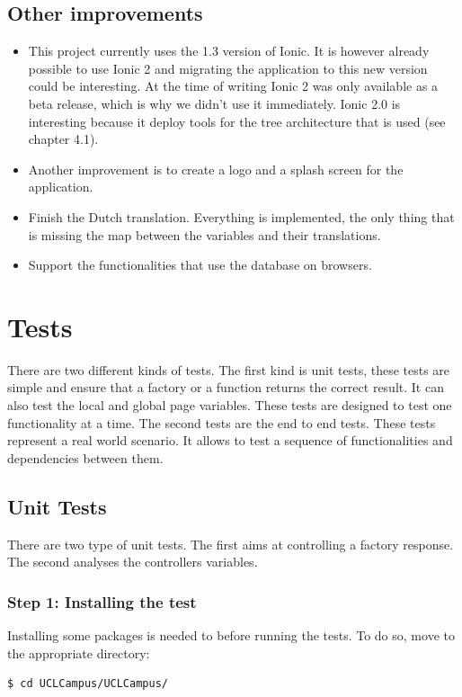\documentclass{eplmastersthesis}
\begin{document}
\subsection{Other improvements}
\begin{itemize}
\item This project currently uses the 1.3 version of Ionic. It is however already possible to use Ionic 2 and migrating the application to this new version could be interesting. At the time of writing Ionic 2 was only available as a beta release, which is why we didn't use it immediately. Ionic 2.0 is interesting because it deploy tools for the tree architecture that is used (see chapter 4.1).
\item Another improvement is to create a logo and a splash screen for the application.
\item Finish the Dutch translation. Everything is implemented, the only thing that is missing the map between the variables and their translations.
\item Support the functionalities that use the database on browsers. 
\end{itemize}
\section{Tests}
There are two different kinds of tests. The first kind is unit tests, these tests are simple and ensure that a factory or a function returns the correct result. It can also test the local and global page variables. These tests are designed to test one functionality at a time.
The second tests are the end to end tests. These tests represent a real world scenario. It allows to test a sequence of functionalities and dependencies between them.
\subsection{Unit Tests}
There are two type of unit tests. The first aims at controlling a factory response. The second analyses the controllers variables.
\subsubsection{Step 1: Installing the test}
Installing some packages is needed to before running the tests. To do so, move to the appropriate directory:
\begin{lstlisting}[language=bash]
   $ cd UCLCampus/UCLCampus/
\end{lstlisting}
\end{document}
